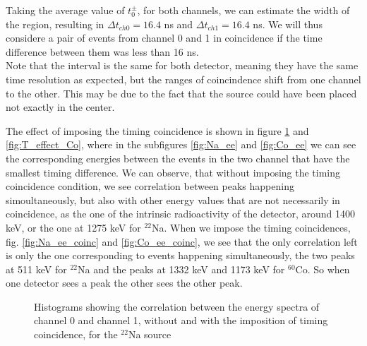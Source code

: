 Taking the average value of $t_{0}^{\pm}$, for both channels, we can estimate the width of the region, resulting in $ \Delta t_{ch0}=16.4$ ns and $\Delta t_{ch1}=16.4$ ns. We will thus considere a pair of events from channel 0 and 1 in coincidence if the time difference between them was less than 16 ns. \\
Note that the interval is the same for both detector, meaning they have the same time resolution as expected, but the ranges of coincindence shift from one channel to the other. This may be due to the fact that the source could have been placed not exactly in the center.

The effect of imposing the timing coincidence is shown in figure \ref{fig:T_effect_Na} and \ref{fig:T_effect_Co}, where in the subfigures \ref{fig:Na_ee} and \ref{fig:Co_ee} we can see the corresponding energies between the events in the two channel that have the smallest timing difference. We can observe, that without imposing the timing coincidence condition, we see correlation between peaks happening simoultaneously, but also with other energy values that are not necessarily in coincidence, as the one of the intrinsic radioactivity of the detector, around 1400 keV, or the one at 1275 keV for $^{22}$Na.
When we impose the timing coincidences, fig. \ref{fig:Na_ee_coinc} and \ref{fig:Co_ee_coinc}, we see that the only correlation left is only the one corresponding to events happening simultaneously, the two peaks at 511 keV for $^{22}$Na and the peaks at 1332 keV and 1173 keV for $^{60}$Co. So when one detector sees a peak the other sees the other peak.
\begin{figure}[H]
	\begin{minipage}[c]{0.5\linewidth}
	\end{minipage}
	\begin{minipage}[]{0.5\linewidth}
	\centering
	\end{minipage}
	\caption{Histograms showing the correlation between the energy spectra of channel 0 and channel 1, without and with the imposition of timing coincidence, for the $^{22}$Na source}
    \label{fig:T_effect_Na}
	\end{figure}
